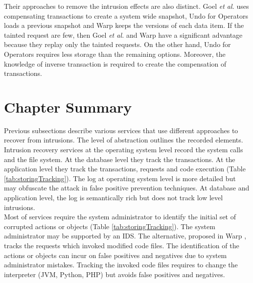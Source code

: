 Their approaches to remove the intrusion effects are also distinct. Goel \textit{et al.} uses compensating transactions to create a system wide snapshot, Undo for Operators loads a previous snapshot and Warp keeps the versions of each data item. If the tainted request are few, then Goel \textit{et al.} and Warp have a significant advantage because they replay only the tainted requests. On the other hand, Undo for Operators requires less storage than the remaining options. Moreover, the knowledge of inverse transaction is required to create the compensation of transactions. \\







\section{Chapter Summary}
\label{sec:related:discuss}
Previous subsections describe various services that use different approaches to recover from intrusions. The level of abstraction outlines the recorded elements. Intrusion recovery services at the operating system level record the system calls and the file system. At the database level they track the transactions. At the application level they track the transactions, requests and code execution (Table \ref{tab:storingTracking}). The log at operating system level is more detailed but may obfuscate the attack in false positive prevention techniques. At database and application level, the log is semantically rich but does not track low level intrusions.\\


Most of services require the system administrator to identify the initial set of corrupted actions or objects (Table \ref{tab:storingTracking}). The system administrator may be supported by an \ac{IDS}. The alternative, proposed in Warp \cite{warp}, tracks the requests which invoked modified code files. The identification of the actions or objects can incur on false positives and negatives due to system administrator mistakes. Tracking the invoked code files requires to change the interpreter (JVM, Python, PHP) but avoids false positives and negatives.\\

